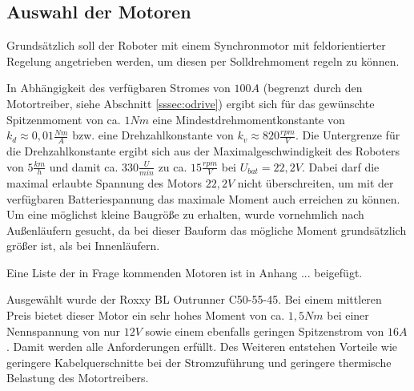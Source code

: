 \renewcommand{\autoren}{Stephan Morongowski}
\newpage
\subsection{Auswahl der Motoren}

Grundsätzlich soll der Roboter mit einem Synchronmotor mit feldorientierter Regelung angetrieben werden, um diesen per Solldrehmoment regeln zu können.

In Abhängigkeit des verfügbaren Stromes von \(100 A\) (begrenzt durch den Motortreiber, siehe Abschnitt \ref{sssec:odrive}) ergibt sich für das gewünschte Spitzenmoment von ca. \(1 Nm\) eine Mindestdrehmomentkonstante von \(k_d \approx 0,01 \frac{Nm}{A}\) bzw. eine Drehzahlkonstante von \(k_v \approx  820 \frac{rpm}{V}\). Die Untergrenze für die Drehzahlkonstante ergibt sich aus der Maximalgeschwindigkeit des Roboters von \(5 \frac{km}{h}\) und damit ca. \(330 \frac{U}{min}\) zu ca. \(15 \frac{rpm}{V}\) bei \(U_{bat} = 22,2 V\). Dabei darf die maximal erlaubte Spannung des Motors \(22,2 V\) nicht überschreiten, um mit der verfügbaren Batteriespannung das maximale Moment auch erreichen zu können. Um eine möglichst kleine Baugröße zu erhalten, wurde vornehmlich nach Außenläufern gesucht, da bei dieser Bauform das mögliche Moment grundsätzlich größer ist, als bei Innenläufern.

Eine Liste der in Frage kommenden Motoren ist in Anhang ... beigefügt.

\label{sssec:RoxxyMotor}
Ausgewählt wurde der \glqq Roxxy BL Outrunner C50-55-45\grqq{}. Bei einem mittleren Preis bietet dieser Motor ein sehr hohes Moment von ca. \(1,5 Nm\) bei einer Nennspannung von nur \(12 V\) sowie einem ebenfalls geringen Spitzenstrom von \(16 A\). Damit werden alle Anforderungen erfüllt. Des Weiteren entstehen Vorteile wie geringere Kabelquerschnitte bei der Stromzuführung und geringere thermische Belastung des Motortreibers.
\newpage

